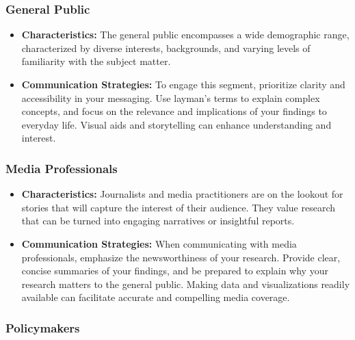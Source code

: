\documentclass[
]{book}
\providecommand{\tightlist}{%
  \setlength{\itemsep}{0pt}\setlength{\parskip}{0pt}}
\begin{document}
\hypertarget{general-public}{%
\subsubsection*{General Public}\label{general-public}}

\begin{itemize}
\tightlist
\item
  \textbf{Characteristics:} The general public encompasses a wide demographic range, characterized by diverse interests, backgrounds, and varying levels of familiarity with the subject matter.
\item
  \textbf{Communication Strategies:} To engage this segment, prioritize clarity and accessibility in your messaging. Use layman's terms to explain complex concepts, and focus on the relevance and implications of your findings to everyday life. Visual aids and storytelling can enhance understanding and interest.
\end{itemize}

\hypertarget{media-professionals}{%
\subsubsection*{Media Professionals}\label{media-professionals}}

\begin{itemize}
\tightlist
\item
  \textbf{Characteristics:} Journalists and media practitioners are on the lookout for stories that will capture the interest of their audience. They value research that can be turned into engaging narratives or insightful reports.
\item
  \textbf{Communication Strategies:} When communicating with media professionals, emphasize the newsworthiness of your research. Provide clear, concise summaries of your findings, and be prepared to explain why your research matters to the general public. Making data and visualizations readily available can facilitate accurate and compelling media coverage.
\end{itemize}

\hypertarget{policymakers}{%
\subsubsection*{Policymakers}\label{policymakers}}
\end{document}
